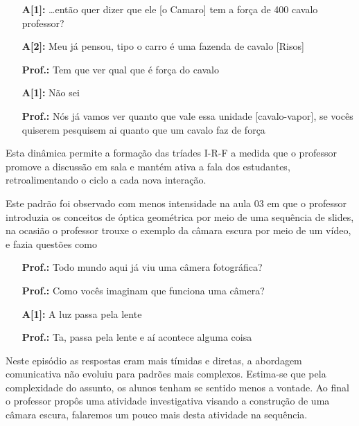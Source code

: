 \begin{center}
    \begin{minipage}{0.7\textwidth}
    \begin{itemize} 
        \item[\textbf{A[1]:}] \ldots então quer dizer que ele [o Camaro] tem a força de 400 cavalo professor?        
        \item[\textbf{A[2]:}] Meu já pensou, tipo o carro é uma fazenda de cavalo [Risos]
        \item[\textbf{Prof.:}] Tem que ver qual que é força do cavalo
        \item[\textbf{A[1]:}] Não sei
        \item[\textbf{Prof.:}] Nós já vamos ver quanto que vale essa unidade [cavalo-vapor], se vocês quiserem pesquisem ai quanto que um cavalo faz de força
    \end{itemize}        
    \end{minipage}
\end{center}
Esta dinâmica permite a formação das tríades I-R-F a medida que o professor promove a discussão em sala e mantém ativa a fala dos estudantes, retroalimentando o ciclo a cada nova interação.

Este padrão foi observado com menos intensidade na aula 03 em que o professor introduzia os conceitos de óptica geométrica por meio de uma sequência de slides, na ocasião o professor trouxe o exemplo da câmara escura por meio de um vídeo, e fazia questões como

\begin{center}
    \begin{minipage}{0.7\textwidth}
        \begin{itemize}
            \item[\textbf{Prof.:}] Todo mundo aqui já viu uma câmera fotográfica?
            \item[\textbf{Prof.:}] Como vocês imaginam que funciona uma câmera?
            \item[\textbf{A[1]:}] A luz passa pela lente
            \item[\textbf{Prof.:}] Ta, passa pela lente e aí acontece alguma coisa
        \end{itemize}
    \end{minipage}
\end{center}

 Neste episódio as respostas eram mais tímidas e diretas, a abordagem comunicativa não evoluiu para padrões mais complexos. Estima-se que pela complexidade do assunto, os alunos tenham se sentido menos a vontade. Ao final o professor propôs uma atividade investigativa visando a construção de uma câmara escura, falaremos um pouco mais desta atividade na sequência.

